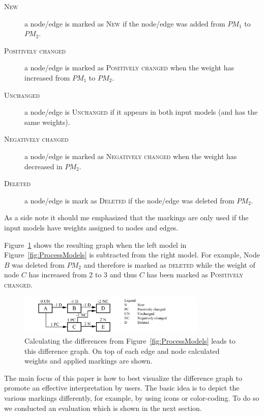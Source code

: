 \documentclass{llncs}
\begin{document}
\begin{description}
	\item[\textsc{New}] a node/edge is marked as \textsc{New} if the node/edge was added from $PM_1$ to $PM_2$.
	\item[\textsc{Positively changed}] a node/edge is marked as \textsc{Positively changed} when the weight has increased from $PM_1$ to $PM_2$.
	\item[\textsc{Unchanged}] a node/edge is \textsc{Unchanged} if it appears in both input models (and has the same weights).
	\item[\textsc{Negatively changed}] a node/edge is marked as \textsc{Negatively changed} when the weight has decreased in $PM_2$.
	\item[\textsc{Deleted}] a node/edge is mark as \textsc{Deleted} if the node/edge was deleted from $PM_2$.
\end{description}

As a side note it should me emphasized that the markings are only used if the input models have weights assigned to nodes and edges.

Figure~\ref{fig:DiffGraphCalculation} shows the resulting graph when the left model in Figure~\ref{fig:ProcessModels} is subtracted from the right model. For example, Node $B$ was deleted from $PM_2$ and therefore is marked as \textsc{deleted} while the weight of node $C$ has increased from 2 to 3 and thus $C$ has been marked as \textsc{Positively changed}. 

\begin{figure}
	\centering
	\includegraphics[width=0.8\textwidth]{Images/ResultGraph.PNG}
	\caption{Calculating the differences from Figure~\ref{fig:ProcessModels} leads to this difference graph. On top of each edge and node calculated weights and applied markings are shown.}
	\label{fig:DiffGraphCalculation}
\end{figure}

The main focus of this paper is how to best visualize the difference graph to promote an effective interpretation by users. The basic idea is to depict the various markings differently, for example, by using icons or color-coding. To do so we conducted an evaluation which is shown in the next section.
\end{document}
